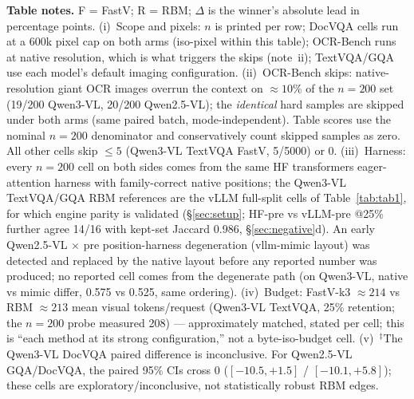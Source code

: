 \documentclass[journal]{IEEEtran}
\begin{document}
\begin{table}[t]
  \vspace{3pt}
  \footnotesize
  \textbf{Table notes.} F = FastV; R = RBM; $\Delta$ is the winner's absolute
  lead in percentage points. (i)~Scope and pixels: $n$ is printed per row; DocVQA
  cells run at a 600k pixel cap on both arms (iso-pixel within this table);
  OCR-Bench runs at native resolution, which is what triggers the skips
  (note~ii); TextVQA/GQA use each model's default imaging configuration.
  (ii)~OCR-Bench skips: native-resolution giant OCR images overrun the context
  on $\approx 10\%$ of the $n = 200$ set (19/200 Qwen3-VL, 20/200 Qwen2.5-VL);
  the \emph{identical} hard samples are skipped under both arms (same paired
  batch, mode-independent). Table scores use the nominal $n=200$ denominator
  and conservatively count skipped samples as zero. All other cells skip
  $\leq 5$ (Qwen3-VL TextVQA
  FastV, 5/5000) or 0. (iii)~Harness: every $n = 200$ cell on both sides comes
  from the same HF transformers eager-attention harness with family-correct
  native positions; the Qwen3-VL TextVQA/GQA RBM references are the vLLM
  full-split cells of Table~\ref{tab:tab1}, for which engine parity is validated
  (\S\ref{sec:setup}; HF-pre vs vLLM-pre @25\% further agree 14/16 with kept-set
  Jaccard 0.986, \S\ref{sec:negative}d). An early Qwen2.5-VL $\times$ pre
  position-harness degeneration (vllm-mimic layout) was detected and replaced by
  the native layout before any reported number was produced; no reported cell
  comes from the degenerate path (on Qwen3-VL, native vs mimic differ, 0.575 vs
  0.525, same ordering). (iv)~Budget: FastV-k3 $\approx 214$ vs RBM
  $\approx 213$ mean visual tokens/request (Qwen3-VL TextVQA, 25\% retention;
  the $n = 200$ probe measured 208) --- approximately matched, stated per cell;
  this is ``each method at its strong configuration,'' not a byte-iso-budget
  cell. (v)~$^{\ddagger}$The Qwen3-VL DocVQA paired difference is inconclusive.
  For Qwen2.5-VL GQA/DocVQA, the paired 95\% CIs cross 0
  ($[-10.5, +1.5]$ / $[-10.1, +5.8]$); these cells are
  exploratory/inconclusive, not statistically robust RBM edges.
\end{table}

\end{document}
